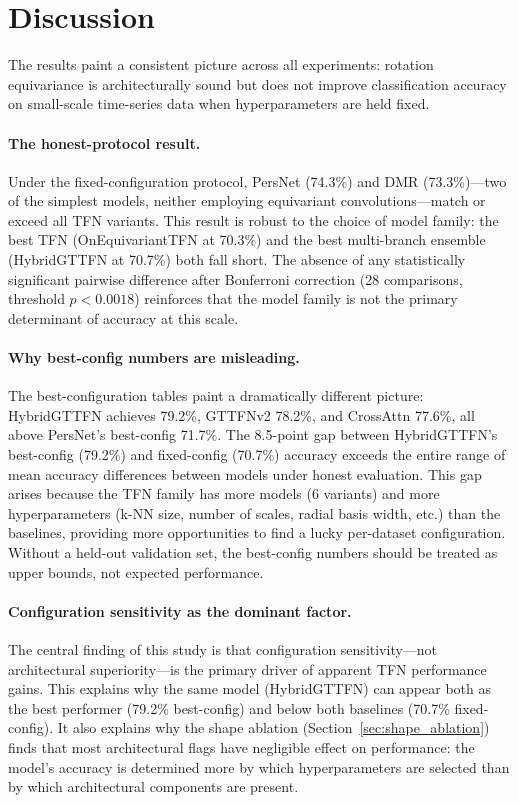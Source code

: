 \documentclass[a4paper,11pt]{article}
\begin{document}
\section{Discussion}

The results paint a consistent picture across all experiments: rotation equivariance is architecturally sound but does not improve classification accuracy on small-scale time-series data when hyperparameters are held fixed.

\paragraph{The honest-protocol result.}
Under the fixed-configuration protocol, PersNet (74.3\%) and DMR (73.3\%)---two of the simplest models, neither employing equivariant convolutions---match or exceed all TFN variants.
This result is robust to the choice of model family: the best TFN (OnEquivariantTFN at 70.3\%) and the best multi-branch ensemble (HybridGTTFN at 70.7\%) both fall short.
The absence of any statistically significant pairwise difference after Bonferroni correction (28 comparisons, threshold $p\!<\!0.0018$) reinforces that the model family is not the primary determinant of accuracy at this scale.

\paragraph{Why best-config numbers are misleading.}
The best-configuration tables paint a dramatically different picture: HybridGTTFN achieves 79.2\%, GTTFNv2 78.2\%, and CrossAttn 77.6\%, all above PersNet's best-config 71.7\%.
The 8.5-point gap between HybridGTTFN's best-config (79.2\%) and fixed-config (70.7\%) accuracy exceeds the entire range of mean accuracy differences between models under honest evaluation.
This gap arises because the TFN family has more models (6 variants) and more hyperparameters (k-NN size, number of scales, radial basis width, etc.) than the baselines, providing more opportunities to find a lucky per-dataset configuration.
Without a held-out validation set, the best-config numbers should be treated as upper bounds, not expected performance.

\paragraph{Configuration sensitivity as the dominant factor.}
The central finding of this study is that configuration sensitivity---not architectural superiority---is the primary driver of apparent TFN performance gains.
This explains why the same model (HybridGTTFN) can appear both as the best performer (79.2\% best-config) and below both baselines (70.7\% fixed-config).
It also explains why the shape ablation (Section~\ref{sec:shape_ablation}) finds that most architectural flags have negligible effect on performance: the model's accuracy is determined more by which hyperparameters are selected than by which architectural components are present.
\end{document}
